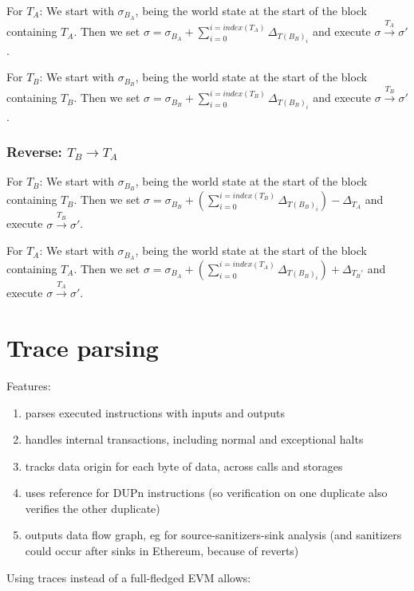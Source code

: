 \documentclass[draft,final]{vutinfth} %
\begin{document}
For $T_A$: We start with $\sigma_{B_A}$, being the world state at the start of the block containing $T_A$. Then we set $\sigma = \sigma_{B_A} + \sum_{i=0}^{i=index(T_A)}\Delta_{T(B_B)_i}$ and execute $\sigma \xrightarrow{T_A} \sigma\prime$.

For $T_B$: We start with $\sigma_{B_B}$, being the world state at the start of the block containing $T_B$. Then we set $\sigma = \sigma_{B_B} + \sum_{i=0}^{i=index(T_B)}\Delta_{T(B_B)_i}$ and execute $\sigma \xrightarrow{T_B} \sigma\prime$.

\subsubsection{Reverse: $T_B \rightarrow T_A$}


For $T_B$: We start with $\sigma_{B_B}$, being the world state at the start of the block containing $T_B$. Then we set $\sigma = \sigma_{B_B} + (\sum_{i=0}^{i=index(T_B)}\Delta_{T(B_B)_i}) - \Delta_{T_A}$ and execute $\sigma \xrightarrow{T_B} \sigma\prime$.

For $T_A$: We start with $\sigma_{B_A}$, being the world state at the start of the block containing $T_A$. Then we set $\sigma = \sigma_{B_A} + (\sum_{i=0}^{i=index(T_A)}\Delta_{T(B_B)_i}) + \Delta_{T_B\prime}$ and execute $\sigma \xrightarrow{T_A} \sigma\prime$.

\section{Trace parsing}

Features:

\begin{enumerate}
    \item parses executed instructions with inputs and outputs
    \item handles internal transactions, including normal and exceptional halts
    \item tracks data origin for each byte of data, across calls and storages
    \item uses reference for DUPn instructions (so verification on one duplicate also verifies the other duplicate)
    \item outputs data flow graph, eg for source-sanitizers-sink analysis (and sanitizers could occur after sinks in Ethereum, because of reverts)
\end{enumerate}

Using traces instead of a full-fledged EVM allows:
\end{document}
